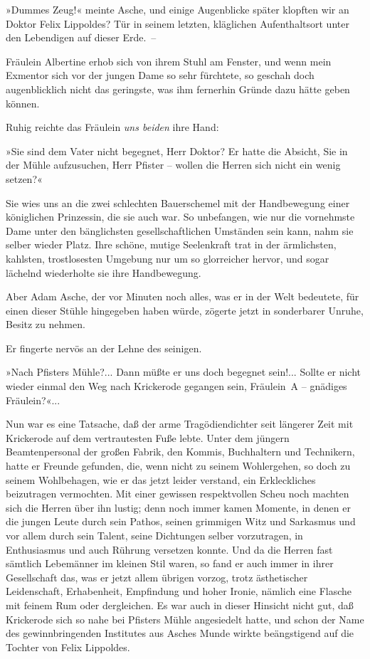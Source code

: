 »Dummes Zeug!« meinte Asche, und einige Augenblicke später klopften
wir an Doktor Felix Lippoldes? Tür in seinem letzten, kläglichen
Aufenthaltsort unter den Lebendigen auf dieser Erde.~–

Fräulein Albertine erhob sich von ihrem Stuhl am Fenster, und wenn
mein Exmentor sich vor der jungen Dame so sehr fürchtete, so
geschah doch augenblicklich nicht das geringste, was ihm fernerhin
Gründe dazu hätte geben können.

Ruhig reichte das Fräulein \emph{uns beiden} ihre Hand:

»Sie sind dem Vater nicht begegnet, Herr Doktor? Er hatte die
Absicht, Sie in der Mühle aufzusuchen, Herr Pfister – wollen die
Herren sich nicht ein wenig setzen?«

Sie wies uns an die zwei schlechten Bauerschemel mit der
Handbewegung einer königlichen Prinzessin, die sie auch war. So
unbefangen, wie nur die vornehmste Dame unter den bänglichsten
gesellschaftlichen Umständen sein kann, nahm sie selber wieder
Platz. Ihre schöne, mutige Seelenkraft trat in der ärmlichsten,
kahlsten, trostlosesten Umgebung nur um so glorreicher hervor, und
sogar lächelnd wiederholte sie ihre Handbewegung.

Aber Adam Asche, der vor Minuten noch alles, was er in der Welt
bedeutete, für einen dieser Stühle hingegeben haben würde, zögerte
jetzt in sonderbarer Unruhe, Besitz zu nehmen.

Er fingerte nervös an der Lehne des seinigen.

»Nach Pfisters Mühle?... Dann müßte er uns doch begegnet sein!...
Sollte er nicht wieder einmal den Weg nach Krickerode gegangen
sein, Fräulein~A – gnädiges Fräulein?«...

Nun war es eine Tatsache, daß der arme Tragödiendichter seit
längerer Zeit mit Krickerode auf dem vertrautesten Fuße lebte.
Unter dem jüngern Beamtenpersonal der großen Fabrik, den Kommis,
Buchhaltern und Technikern, hatte er Freunde gefunden, die, wenn
nicht zu seinem Wohlergehen, so doch zu seinem Wohlbehagen, wie er
das jetzt leider verstand, ein Erkleckliches beizutragen
vermochten. Mit einer gewissen respektvollen Scheu noch machten
sich die Herren über ihn lustig; denn noch immer kamen Momente, in
denen er die jungen Leute durch sein Pathos, seinen grimmigen Witz
und Sarkasmus und vor allem durch sein Talent, seine Dichtungen
selber vorzutragen, in Enthusiasmus und auch Rührung versetzen
konnte. Und da die Herren fast sämtlich Lebemänner im kleinen Stil
waren, so fand er auch immer in ihrer Gesellschaft das, was er
jetzt allem übrigen vorzog, trotz ästhetischer Leidenschaft,
Erhabenheit, Empfindung und hoher Ironie, nämlich eine Flasche mit
feinem Rum oder dergleichen. Es war auch in dieser Hinsicht nicht
gut, daß Krickerode sich so nahe bei Pfisters Mühle angesiedelt
hatte, und schon der Name des gewinnbringenden Institutes aus
Asches Munde wirkte beängstigend auf die Tochter von Felix
Lippoldes.

